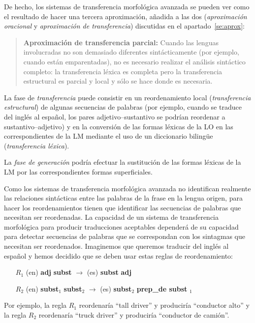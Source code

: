 De hecho, los sistemas de transferencia morfológica avanzada se pueden ver como el resultado de hacer una tercera aproximación, añadida a las dos (\emph{aproximación oracional} y \emph{aproximación de transferencia}) discutidas en el apartado~\ref{se:aprox}: \begin{quote} \textbf{Aproximación de transferencia parcial:} Cuando las lenguas involucradas no son demasiado diferentes sintácticamente (por ejemplo, cuando están emparentadas), no es necesario realizar el análisis sintáctico completo: la transferencia léxica es completa pero la transferencia estructural es parcial y local y sólo se hace donde es necesaria. \end{quote} 

La fase de \emph{transferencia} puede consistir en un reordenamiento local (\emph{transferencia estructural}) de algunas secuencias de palabras (por ejemplo, cuando se traduce del inglés al español, los pares adjetivo--sustantivo se podrían reordenar a sustantivo--adjetivo) y en la conversión de las formas léxicas de la LO en las correspondientes de la LM mediante el uso de un diccionario bilingüe (\emph{transferencia léxica}). 

La \emph{fase de generación} podría efectuar la sustitución de las formas léxicas de la LM por las correspondientes formas superficiales. 

Como los sistemas de transferencia morfológica avanzada no identifican realmente las relaciones sintácticas entre las palabras de la frase en la lengua origen, para hacer los reordenamientos tienen que identificar las secuencias de palabras que necesitan ser reordenadas. La capacidad de un sistema de transferencia morfológica para producir traducciones aceptables dependerá de su capacidad para detectar secuencias de palabras que se correspondan con los sintagmas que necesitan ser reordenados. Imaginemos que queremos traducir del inglés al español y hemos decidido que se deben usar estas reglas de reordenamiento: \begin{itemize} \item [$R_1$] (en) \textbf{adj} \textbf{subst} $\rightarrow$ (es) \textbf{subst} \textbf{adj} \item [$R_2$] (en) \textbf{subst}$_1$ \textbf{subst}$_2$ $\rightarrow$ (es) \textbf{subst}$_2$ \textbf{prep\_de subst} \textbf{}$_1$ \end{itemize} Por ejemplo, la regla $R_1$ reordenaría ``tall driver'' y produciría ``conductor alto'' y la regla $R_2$ reordenaría ``truck driver'' y produciría ``conductor de camión''. 

